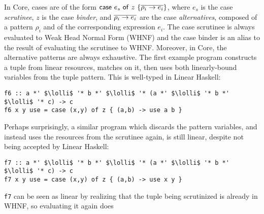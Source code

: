 \documentclass[acmsmall,review,screen]{acmart}
\newcommand{\incode}[1]{\lstinline{#1}}
\newcommand{\parawith}[1]{\paragraph{\emph{#1}}}
\newcommand{\lolli}{\multimap}
\newcommand{\ccase}[2]{\mathsf{case}~#1~\mathsf{of}~#2}
\newcommand{\ROUNDTWO}[1]{{\color{red}#1}}
\begin{document}
In Core, cases are of the form $\ccase{e_s}{z~\{\ov{\rho_i \to e_i}\}}$,
where $e_s$ is the case \emph{scrutinee}, $z$ is the case \emph{binder}, and
$\overline{\rho_i \to e_i}$ are the case \emph{alternatives}, composed of a pattern
$\rho_i$ and of the corresponding expression $e_i$. 
The case scrutinee is always evaluated to Weak Head Normal Form (WHNF) and
%
%
the case binder is an alias to the result of evaluating the scrutinee
to WHNF. Moreover, in Core, the alternative patterns are always exhaustive.
%
%
%
\ROUNDTWO{The first} example program constructs a tuple from linear resources,
matches on it, then uses both linearly-bound variables from the tuple pattern.
This is well-typed in Linear Haskell:
\begin{working}
\begin{lstlisting}
f6 :: a *' $\lolli$ '* b *' $\lolli$ '* (a *' $\lolli$ '* b *' $\lolli$ '* c) -> c
f6 x y use = case (x,y) of z { (a,b) -> use a b }
\end{lstlisting}
\end{working}
\ROUNDTWO{Perhaps surprisingly}, a similar program which discards the pattern
variables, and instead uses the resources \ROUNDTWO{from} the scrutinee
\ROUNDTWO{again}, is still linear, despite not being accepted by Linear Haskell:
\begin{notyet}
\begin{lstlisting}
f7 :: a *' $\lolli$ '* b *' $\lolli$ '* (a *' $\lolli$ '* b *' $\lolli$ '* c) -> c
f7 x y use = case (x,y) of z { (a,b) -> use x y }
\end{lstlisting}
\end{notyet}
\incode{f7} \ROUNDTWO{can be seen as} linear by \ROUNDTWO{realizing} that
the tuple being scrutinized is already in WHNF, so evaluating it again does
\end{document}
